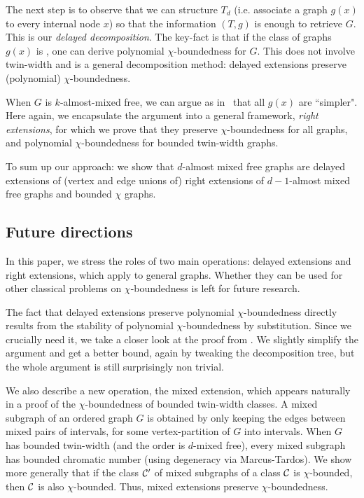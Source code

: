 The next step is to observe that we can structure $T_d$ (i.e. associate a graph $g(x)$ to every internal node $x$) so that the information $(T,g)$ is enough to retrieve $G$. This is our \emph{delayed decomposition}. The key-fact is that if the class of graphs $g(x)$ is \pcb, one can derive polynomial $\chi$-boundedness for $G$. This does not involve twin-width and is a general decomposition method: delayed extensions preserve (polynomial) $\chi$-boundedness.

When $G$ is $k$-almost-mixed free, we can argue as in~\cite{PS22} that all $g(x)$ are ``simpler". Here again, we encapsulate the argument into a general framework, \emph{right extensions}, for which we prove that they preserve $\chi$-boundedness for all graphs, and polynomial $\chi$-boundedness for bounded twin-width graphs.

To sum up our approach: we show that $d$-almost mixed free graphs are delayed extensions of (vertex and edge unions of) right extensions of $d-1$-almost mixed free graphs and bounded $\chi$ graphs.

\subsection{Future directions}

In this paper, we stress the roles of two main operations: delayed extensions and right extensions, which apply to general graphs. Whether they can be used for other classical problems on $\chi$-boundedness is left for future research.

The fact that delayed extensions preserve polynomial $\chi$-boundedness directly results from the stability of polynomial $\chi$-boundedness by substitution. Since we crucially need it, we take a closer look at the proof from \cite{CPST13}. We slightly simplify the argument and get a better bound, again by tweaking the decomposition tree, but the whole argument is still surprisingly non trivial.

We also describe a new operation, the mixed extension, which appears naturally in a proof of the $\chi$-boundedness of bounded twin-width classes. A mixed subgraph of an ordered graph $G$ is obtained by only keeping the edges between mixed pairs of intervals, for some vertex-partition of $G$ into intervals. When $G$ has bounded twin-width (and the order is $d$-mixed free), every mixed subgraph has bounded chromatic number (using degeneracy via Marcus-Tardos). We show more generally that if the class $\cal C'$ of mixed subgraphs of a class $\cal C$ is $\chi$-bounded, then $\cal C$ is also $\chi$-bounded. Thus, mixed extensions preserve $\chi$-boundedness.
